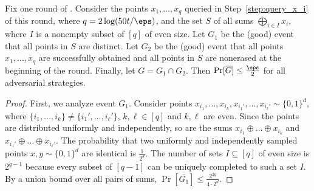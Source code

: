 \documentclass{toc}
\begin{document}
\begin{lemma}
\label{lem:distinct_and_nonerased}
Fix one round of . Consider the points  $x_1,\dots, x_q$ queried in Step~\ref{step:query_x_i} of this round, where $q = 2\log(50t/\eps)$,
and the set $S$ of all sums $\bigoplus_{i\in I}x_i,$ where $I$ is a nonempty subset of $[q]$ of even size.
Let $G_1$ be the (good) event that all points in $S$
are distinct. Let $G_2$ be the (good) event that all points $x_1,\dots,x_q$
are successfully obtained and all points in $S$
are nonerased at the beginning of the round. Finally, let $G = G_1 \cap G_2$. Then $\Pr[\overline{G}] \le \frac{\eps}{2}$ for all adversarial strategies.
\end{lemma}
\begin{proof}
First, we analyze event $G_1$. Consider points $x_{i_1}, \dots, x_{i_{k}}, x_{i_1'}, \dots, x_{i_{\ell}'} \sim \{0,1\}^d$,  where $\{i_1, \dots, i_k\} \neq \{i_1', \dots, i_\ell'\}$, $k, \ell \in [q]$ and $k, \ell$ are even. Since the points are distributed uniformly and independently, so are the sums $x_{i_1} \oplus\dots\oplus x_{i_{k}}$ and $x_{i_1'}\oplus\dots\oplus x_{i_{\ell}'}$. The probability that two uniformly and independently sampled points $x,y \sim \{0,1\}^d$ are identical is $\frac{1}{2^d}$. The number of sets $I \subseteq [q]$ of even size is $2^{q-1}$ because every subset of $[q-1]$ can be uniquely completed to such a set $I$.
%
%
%
%
%
%
By a union bound over all pairs of sums, $\Pr[\overline{G_1}] 
%
\leq \frac{2^{2q}}{4 \cdot 2^d}$. 


\end{proof}
\end{document}
